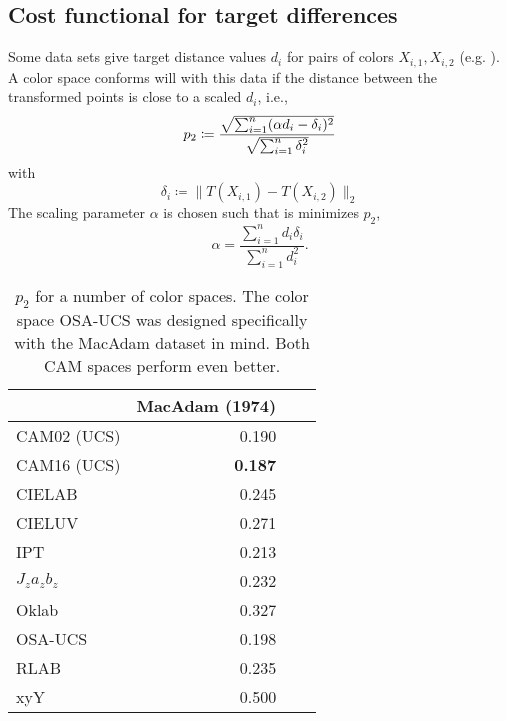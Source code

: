 \documentclass{scrartcl}
\theoremstyle{named}
\begin{document}
\subsection{Cost functional for target differences}

Some data sets give target distance values $d_i$ for pairs of colors $X_{i,1}, X_{i,2}$
(e.g.  \cite{macadam1974}). A color space conforms will with this data if the distance
between the transformed points is close to a scaled $d_i$, i.e.,
\begin{equation}\label{eq:p}
  p_2
  \coloneqq
  \frac{%
    \sqrt{\sum_{i=1}^n (\alpha d_i - \delta_i)^2}
  }{
    \sqrt{\sum_{i=1}^n \delta_i^2}
  }
\end{equation}
with
\[
  \delta_i \coloneqq \|T(X_{i,1}) - T(X_{i,2})\|_2
\]
The scaling parameter $\alpha$ is chosen such that is minimizes $p_2$,
\[
  \alpha = \frac{\sum_{i=1}^n d_i \delta_i}{\sum_{i=1}^n d_i^2}.
\]

\begin{table}
  \centering
  \begin{tabular}{lrrr}
    \toprule
    & MacAdam (1974)\\
    \midrule
CAM02 (UCS) & 0.190\\
CAM16 (UCS) & \textbf{0.187}\\
CIELAB & 0.245\\
CIELUV & 0.271\\
IPT & 0.213\\
$J_za_zb_z$ & 0.232\\
Oklab & 0.327\\
OSA-UCS & 0.198\\
RLAB & 0.235\\
xyY & 0.500\\
    \bottomrule
  \end{tabular}
  \caption{$p_2$ for a number of color spaces. The color space OSA-UCS was designed
  specifically with the MacAdam dataset in mind. Both CAM spaces perform even better.}
\end{table}


\end{document}
